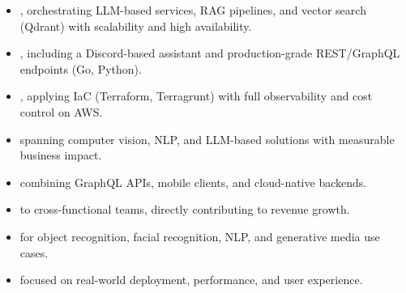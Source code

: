 

\begin{itemize}
  \item {}, orchestrating LLM-based services, RAG pipelines, and vector search (Qdrant) with scalability and high availability.
  \item {}, including a Discord-based assistant and production-grade REST/GraphQL endpoints (Go, Python).
  \item {}, applying IaC (Terraform, Terragrunt) with full observability and cost control on AWS.
\end{itemize}

\divider


\begin{itemize}
  \item {} spanning computer vision, NLP, and LLM-based solutions with measurable business impact.
  \item {} combining GraphQL APIs, mobile clients, and cloud-native backends.
  \item {} to cross-functional teams, directly contributing to revenue growth.
\end{itemize}

\divider

\begin{itemize}
  \item {} for object recognition, facial recognition, NLP, and generative media use cases.
  \item {} focused on real-world deployment, performance, and user experience.
\end{itemize}

